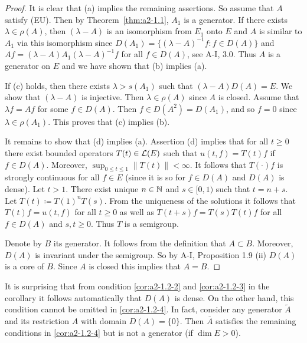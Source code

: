 \begin{proof}
It is clear that (a) implies the remaining assertions.
So assume that $A$ satisfy (EU).
Then by Theorem~\ref{thm:a2-1.1}, $A_{1}$ is a generator.
If there exists $\lambda \in \rho(A)$, then $(\lambda-A)$ is an isomorphism from $E_{1}$ onto $E$ and $A$ is similar to $A_{1}$ via this isomorphism since 
$D(A_{1}) = \{(\lambda-A)^{-1}f \colon f \in D(A)\}$ and $Af = (\lambda-A)A_{1}(\lambda-A)^{-1}f$ for all $f \in D(A)$, 
see A-I, 3.0.
Thus $A$ is a generator on $E$ and we have shown that (b) implies (a).   

If (c)  holds, then there exists $\lambda > s(A_{1})$ such that $(\lambda-A)D(A) = E$.
We show that $(\lambda-A)$ is injective.
Then $\lambda \in \rho(A)$ since $A$ is closed.
Assume that $\lambda f = Af$ for some $f \in D(A)$.
Then $f \in D(A^{2}) = D(A_{1})$, and so $f = 0$ since $\lambda \in \rho(A_{1})$.
This proves that (c) implies (b).  

It remains to show that (d)  implies (a). 
Assertion (d) implies that for all $ t \geq 0 $ there exist bounded operators $ T(t) \in \mathcal{L}(E) $ such that $ u(t,f) = T(t)f $ if $ f \in D(A) $.
Moreover, $ \sup_{0 \leq t \leq 1} \|T(t)\| < \infty $.
It follows that $ T(\cdot)f $ is strongly continuous for all $ f \in E $ (since it is so for $ f \in D(A) $ and $ D(A) $ is dense).
Let $ t > 1 $.
There exist unique $ n \in \mathbb{N} $ and $ s \in [0,1) $ such that $ t = n + s $.
Let $ T(t) \coloneqq T(1)^{n}T(s) $.
From the uniqueness of the solutions it follows that $ T(t)f = u(t,f) $ for all $ t \geq 0 $ as well as $ T(t+s)f = T(s)T(t)f $ for all $ f \in D(A) $ and $ s,t \geq 0 $.
Thus $ T $ is a semigroup.

Denote by $ B $ its generator.
It follows from the definition that $ A \subset B $.
Moreover, $ D(A) $ is invariant under the semigroup.
So by A-I, Proposition 1.9 (ii) $ D(A) $ is a core of $ B $.
Since $ A $ is closed this implies that $ A = B $.
\end{proof}
\begin{remark}\label{rem:a2-1.3}
It is surprising that from condition \ref{cor:a2-1.2-2}   and \ref{cor:a2-1.2-3}   in the corollary it follows automatically that $ D(A) $ is dense.
On the other hand, this condition cannot be omitted in \ref{cor:a2-1.2-4}.   
In fact, consider any generator $ \tilde{A} $ and its restriction $ A $ with domain $ D(A) = \{0\} $.
Then $ \overline{A} $ satisfies the remaining conditions in \ref{cor:a2-1.2-4} but is not a generator (if $ \dim E > 0 $).
\end{remark}
